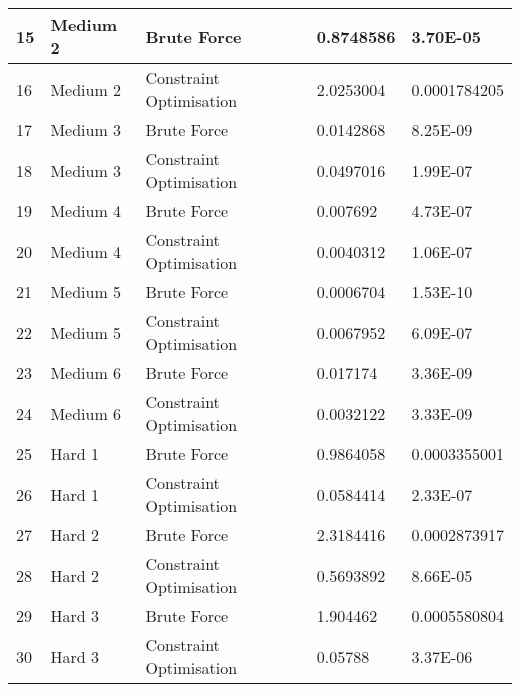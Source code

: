 \documentclass[11pt]{article}
\begin{document}
\begin{table}[!h]
\begin{tabular}{|l|l|l|l|l|}
15             & Medium 2                    & Brute Force              & 0.8748586         & 3.70E-05                    \\ \hline
16             & Medium 2                    & Constraint  Optimisation & 2.0253004         & 0.0001784205                \\ \hline
17             & Medium 3                    & Brute Force              & 0.0142868         & 8.25E-09                    \\ \hline
18             & Medium 3                    & Constraint  Optimisation & 0.0497016         & 1.99E-07                    \\ \hline
19             & Medium 4                    & Brute Force              & 0.007692          & 4.73E-07                    \\ \hline
20             & Medium 4                    & Constraint  Optimisation & 0.0040312         & 1.06E-07                    \\ \hline
21             & Medium 5                    & Brute Force              & 0.0006704         & 1.53E-10                    \\ \hline
22             & Medium 5                    & Constraint  Optimisation & 0.0067952         & 6.09E-07                    \\ \hline
23             & Medium 6                    & Brute Force              & 0.017174          & 3.36E-09                    \\ \hline
24             & Medium 6                    & Constraint  Optimisation & 0.0032122         & 3.33E-09                    \\ \hline
25             & Hard 1                      & Brute Force              & 0.9864058         & 0.0003355001                \\ \hline
26             & Hard 1                      & Constraint  Optimisation & 0.0584414         & 2.33E-07                    \\ \hline
27             & Hard 2                      & Brute Force              & 2.3184416         & 0.0002873917                \\ \hline
28             & Hard 2                      & Constraint  Optimisation & 0.5693892         & 8.66E-05                    \\ \hline
29             & Hard 3                      & Brute Force              & 1.904462          & 0.0005580804                \\ \hline
30             & Hard 3                      & Constraint  Optimisation & 0.05788           & 3.37E-06                    \\ \hline

\end{tabular}
\end{table}
\end{document}
